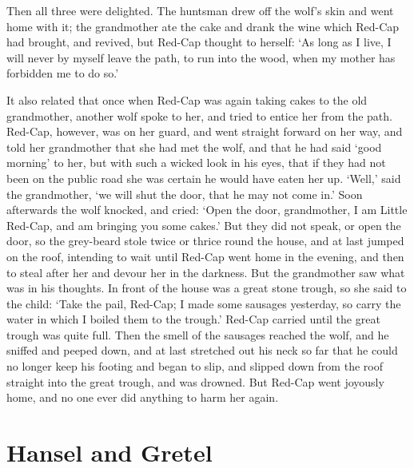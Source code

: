 \documentclass[oneside,11pt]{memoir} %
\begin{document}
	Then all three were delighted. The huntsman drew off the wolf's skin and went home with it; the grandmother ate the cake and drank the wine which Red-Cap had brought, and revived, but Red-Cap thought to herself: `As long as I live, I will never by myself leave the path, to run into the wood, when my mother has forbidden me to do so.'
	
	It also related that once when Red-Cap was again taking cakes to the old grandmother, another wolf spoke to her, and tried to entice her from the path. Red-Cap, however, was on her guard, and went straight forward on her way, and told her grandmother that she had met the wolf, and that he had said `good morning' to her, but with such a wicked look in his eyes, that if they had not been on the public road she was certain he would have eaten her up. `Well,' said the grandmother, `we will shut the door, that he may not come in.' Soon afterwards the wolf knocked, and cried: `Open the door, grandmother, I am Little Red-Cap, and am bringing you some cakes.' But they did not speak, or open the door, so the grey-beard stole twice or thrice round the house, and at last jumped on the roof, intending to wait until Red-Cap went home in the evening, and then to steal after her and devour her in the darkness. But the grandmother saw what was in his thoughts. In front of the house was a great stone trough, so she said to the child: `Take the pail, Red-Cap; I made some sausages yesterday, so carry the water in which I boiled them to the trough.' Red-Cap carried until the great trough was quite full. Then the smell of the sausages reached the wolf, and he sniffed and peeped down, and at last stretched out his neck so far that he could no longer keep his footing and began to slip, and slipped down from the roof straight into the great trough, and was drowned. But Red-Cap went joyously home, and no one ever did anything to harm her again.
	
	
	\chapter{Hansel and Gretel}
	
\end{document}
